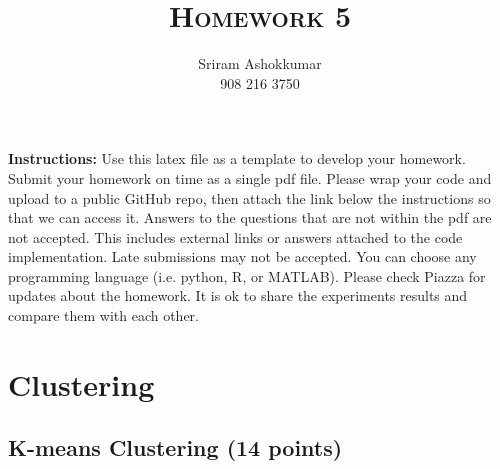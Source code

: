 \documentclass[a4paper]{article}
\title{\textsc{Homework 5}} %
\author{
  Sriram Ashokkumar\\
  908 216 3750\\
}
\date{}
\theoremstyle{definition}
\begin{document}
\maketitle 


\textbf{Instructions:}
Use this latex file as a template to develop your homework. Submit your homework on time as a single pdf file. Please wrap your code and upload to a public GitHub repo, then attach the link below the instructions so that we can access it. Answers to the questions that are not within the pdf are not accepted. This includes external links or answers attached to the code implementation. Late submissions may not be accepted. You can choose any programming language (i.e. python, R, or MATLAB). Please check Piazza for updates about the homework. It is ok to share the experiments results and compare them with each other.

\vspace{0.1in}


\section{Clustering}

\subsection{K-means Clustering (14 points)}
\end{document}
